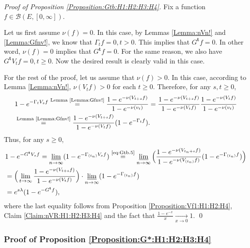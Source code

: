 \documentclass[12pt,a4paper]{amsart}
\numberwithin{equation}{section}
\theoremstyle{plain}
\theoremstyle{definition}
\theoremstyle{remark}
\newcounter{N}
\newcounter{n}[N]
\begin{document}
\begin{proof}[Proof of Proposition \ref{Proposition:Gtb:H1:H2:H3:H4}]
Fix a function $f\in \mathcal B(E,[0,\infty])$.

Let us first assume $\nu(f)=0$.
In this case, by Lemmas \ref{Lemma:nVn!} and \ref{Lemma:Gfnv!}, we know that $\Gamma_t f=0,t> 0$.
This implies that $G^{\mathbf t}f = 0$.
In other word, $\nu(f) = 0$ implies that $G^\mathbf tf = 0$.
For the same reason, we also have $G^{\mathbf t}V_t f = 0, t\geq 0$.
Now the desired result is clearly valid in this case.

For the rest of the proof, let us assume that $\nu(f) > 0$.
In this case, according to Lemma \ref{Lemma:nVn!}, $\nu(V_tf)>0$ for each $t\geq 0$.
Therefore, for any $s,t\geq 0$,
\begin{align}
 & 1 - e^{- \Gamma_t V_s f}
 \overset{\text{Lemma \ref{Lemma:Gfnv!}}}= \frac{ 1 - e^{- \nu(V_{t+s} f)} }{ 1 - e^{- \nu(v_t)}}
 = \frac{ 1 - e^{- \nu(V_{t+s} f)} }{ 1 - e^{- \nu(V_tf)}} \frac{ 1 - e^{ - \nu(V_tf)}}{ 1 - e^{- \nu(v_t)}}
 \\ &  \label{eq:Gtb.5}\overset{\text{Lemma \ref{Lemma:Gfnv!}}}= \frac{ 1 - e^{- \nu(V_{t+s} f)} }{ 1 - e^{- \nu(V_tf)}} ( 1 - e^{- \Gamma_t f}).
 \end{align}
Thus, for any $s\geq 0$,
\begin{align}
 & 1 - e^{- G^{\mathbf t} V_s f}
 = \varliminf_{n\to \infty} ( 1 - e^{- \Gamma_{(t_n)} V_s f})
 \overset{\text{\eqref{eq:Gtb.5}}}= \varliminf_{n\to \infty} \Big( \frac{ 1 - e^{- \nu(V_{t_n+s}f)}}{ 1 - e^{- \nu(V_{(t_n)}f)}} (1 - e^{- \Gamma_{(t_n)} f}) \Big)
 \\& = \Big( \lim_{t \to \infty} \frac{ 1 - e^{- \nu(V_{t+s}f)}}{ 1 - e^{- \nu(V_{t}f)}} \Big) \cdot \varliminf_{n\to \infty} (1 - e^{- \Gamma_{(t_n)} f} )
 \\&= e^{s\lambda} (1 - e^{- G^{\mathbf t}f}),
 \end{align}
 where the last equality follows from Proposition \ref{Proposition:Vf1:H1:H2:H4}, Claim \ref{Claim:nVR:H1:H2:H3:H4} and the fact that $\frac{1-e^{-x}}{x} \xrightarrow[x\to 0]{} 1$.
 \qed
\end{proof}
\subsubsection{Proof of Proposition \ref{Proposition:G*:H1:H2:H3:H4}} \label{sec:G*}
\end{document}
